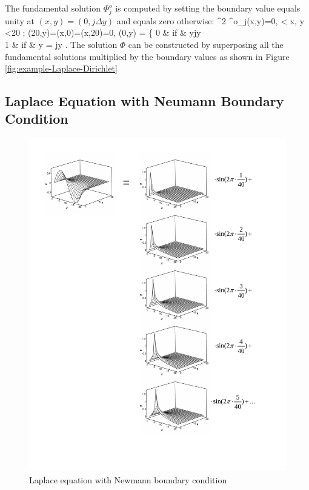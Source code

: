 The fundamental solution $\Phi^o_j$ is computed by setting the boundary value equals unity at $(x,y)=(0,j\Delta y)$ and equals zero otherwise:
\ben
\n^2 \Phi^o_j(x,y)=0, < x, y <20 ; \hst \Phi(20,y)=\Phi(x,0)=\Phi(x,20)=0, \nonumber
\een
\be
\Phi(0,y) = \left\{
0 \hst & if & y\neq j\Delta y \\
1 \hst & if & y = j\Delta y
\eaa
\right.
\ee
The solution $\Phi$ can be constructed by superposing all the fundamental solutions multiplied by the boundary values as shown in Figure \ref{fig:example-Laplace-Dirichlet}

\subsection{Laplace Equation with Neumann Boundary Condition}%

\begin{figure}[htbp]
\includegraphics[width=6in]{../figures/SES/example_Neumann.pdf}
\caption{Laplace equation with Newmann boundary condition}
\label{fig:example-Laplace-Neumann}
\end{figure}



